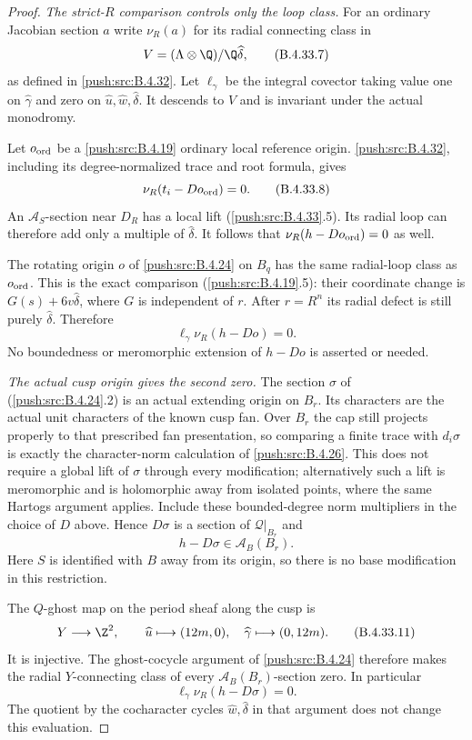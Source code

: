 \begin{proof}
\emph{The strict-$R$ comparison controls only the loop class.}
For an ordinary Jacobian section $a$
write $\nu_R(a)$ for its radial connecting
class in
\[
 V=(\Lambda\otimes\Q)/\Q\widehat\delta,
 \tag{B.4.33.7}
\]
as defined in \ref{push:src:B.4.32}. Let $\ell_\gamma$
be the integral covector taking value one
on $\widehat\gamma$ and zero on
$\widehat u,\widehat w,\widehat\delta$.
It descends to $V$ and is invariant under
the actual monodromy.

Let $o_{\rm ord}$ be a \ref{push:src:B.4.19} ordinary
local reference origin. \ref{push:src:B.4.32}, including
its degree-normalized trace and root
formula, gives
\[
 \nu_R(t_i-D o_{\rm ord})=0.
 \tag{B.4.33.8}
\]
An $\mathcal A_S$-section near $D_R$
has a local lift (\ref{push:src:B.4.33}.5). Its radial
loop can therefore add only a multiple
of $\widehat\delta$. It follows that
$\nu_R(h-D o_{\rm ord})=0$ as well.

The rotating origin $o$ of \ref{push:src:B.4.24} on
$B_q$ has the same radial-loop class
as $o_{\rm ord}$. This is the exact
comparison (\ref{push:src:B.4.19}.5): their coordinate
change is $G(s)+6v\widehat\delta$,
where $G$ is independent of $r$.
After $r=R^n$ its radial defect is still
purely $\widehat\delta$. Therefore
\[
 \ell_\gamma\nu_R(h-D o)=0.
 \tag{B.4.33.9}
\]
No boundedness or meromorphic extension
of $h-D o$ is asserted or needed.

\emph{The actual cusp origin gives the second zero.}
The section $\sigma$ of (\ref{push:src:B.4.24}.2)
is an actual extending origin on $B_r$.
Its characters are the actual unit
characters of the known cusp fan.
Over $B_r$ the cap still projects properly
to that prescribed fan presentation,
so comparing a finite trace with
$d_i\sigma$ is exactly the character-norm
calculation of \ref{push:src:B.4.26}. This does not
require a global lift of $\sigma$
through every modification; alternatively
such a lift is meromorphic and is
holomorphic away from isolated points,
where the same Hartogs argument applies.
Include these bounded-degree norm
multipliers in the choice of $D$ above.
Hence $D\sigma$ is a
section of $\mathcal Q|_{B_r}$ and
\[
                  h-D\sigma\in
                         \mathcal A_B(B_r).
 \tag{B.4.33.10}
\]
Here $S$ is identified with $B$ away
from its origin, so there is no base
modification in this restriction.

The $Q$-ghost map on the period sheaf
along the cusp is
\[
 Y\longrightarrow\Z^2,\qquad
 \widehat u\longmapsto(12m,0),\quad
 \widehat\gamma\longmapsto(0,12m).
 \tag{B.4.33.11}
\]
It is injective. The ghost-cocycle
argument of \ref{push:src:B.4.24} therefore makes the
radial $Y$-connecting class of every
$\mathcal A_B(B_r)$-section zero.
In particular
\[
             \ell_\gamma\nu_R(h-D\sigma)=0.
 \tag{B.4.33.12}
\]
The quotient by the cocharacter cycles
$\widehat w,\widehat\delta$ in that
argument does not change this evaluation.


\end{proof}
